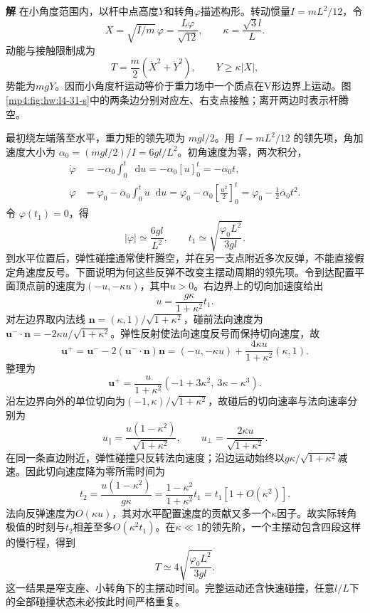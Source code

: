 \documentclass[11pt,openany,fontset=fandol]{ctexbook}
\theoremstyle{definition}\newtheorem{example}{例}[chapter]\newtheorem{exercise}{习题}[chapter]
\newcommand{\SolutionStart}{\par\medskip\ifdim\pagetotal>0pt\ifdim\dimexpr\pagegoal-\pagetotal\relax<3\baselineskip\newpage\fi\fi\noindent\textbf{解}\quad\ignorespaces}
\newenvironment{solution}{\SolutionStart}{\par\medskip}
\newcommand{\dd}{\mathop{}\!\mathrm d}\newcommand{\ee}{\mathrm e}\newcommand{\vct}[1]{\bm{#1}}
\begin{document}
\begin{solution}
在小角度范围内，以杆中点高度$Y$和转角$\varphi$描述构形。转动惯量$I=mL^2/12$，令
\[
 X=\sqrt{I/m}\,\varphi=\frac{L\varphi}{\sqrt{12}},
 \qquad\kappa=\frac{\sqrt3l}{L}.
\]
动能与接触限制成为
\[
 T=\frac m2(\dot X^2+\dot Y^2),\qquad
 Y\ge\kappa|X|,
\]
势能为$mgY$。因而小角度杆运动等价于重力场中一个质点在V形边界上运动。图\ref{mp4:fig:hw:l4-31-s}中的两条边分别对应左、右支点接触；离开两边时表示杆腾空。

最初绕左端落至水平，重力矩的领先项为 $mgl/2$。用 $I=mL^2/12$ 的领先项，角加速度大小为 $\alpha_0=(mgl/2)/I=6gl/L^2$。初角速度为零，两次积分，
\[
\begin{aligned}
\dot\varphi&=-\alpha_0\int_0^t\dd u=-\alpha_0[u]_0^t=-\alpha_0t,\\
\varphi&=\varphi_0-\alpha_0\int_0^t u\dd u
=\varphi_0-\alpha_0\left[\frac{u^2}{2}\right]_0^t
=\varphi_0-\frac12\alpha_0t^2.
\end{aligned}
\]
令 $\varphi(t_1)=0$，得
\[
 |\ddot\varphi|\simeq\frac{6gl}{L^2},\qquad
 t_1\simeq\sqrt{\frac{\varphi_0L^2}{3gl}}.
\]
到水平位置后，弹性碰撞通常使杆腾空，并在另一支点附近多次反弹，不能直接假定角速度反号。下面说明为何这些反弹不改变主摆动周期的领先项。令到达配置平面顶点前的速度为$(-u,-\kappa u)$，其中$u>0$。右边界上的切向加速度给出
\[
u=\frac{g\kappa}{1+\kappa^2}t_1.
\]
对左边界取内法线 $\vct n=(\kappa,1)/\sqrt{1+\kappa^2}$，碰前法向速度为 $\vct u^-\cdot\vct n=-2\kappa u/\sqrt{1+\kappa^2}$。弹性反射使法向速度反号而保持切向速度，故
\[
\vct u^+=\vct u^--2(\vct u^-\cdot\vct n)\vct n
=(-u,-\kappa u)+\frac{4\kappa u}{1+\kappa^2}(\kappa,1).
\]
整理为
\[
\vct u^+=\frac{u}{1+\kappa^2}
(-1+3\kappa^2,\ 3\kappa-\kappa^3).
\]
沿左边界向外的单位切向为$(-1,\kappa)/\sqrt{1+\kappa^2}$，故碰后的切向速率与法向速率分别为
\[
u_\parallel=\frac{u(1-\kappa^2)}{\sqrt{1+\kappa^2}},\qquad
u_\perp=\frac{2\kappa u}{\sqrt{1+\kappa^2}}.
\]
在同一条直边附近，弹性碰撞只反转法向速度；沿边运动始终以$g\kappa/\sqrt{1+\kappa^2}$减速。因此切向速度降为零所需时间为
\[
t_2=\frac{u(1-\kappa^2)}{g\kappa}
=\frac{1-\kappa^2}{1+\kappa^2}t_1
=t_1[1+O(\kappa^2)].
\]
法向反弹速度为$O(\kappa u)$，其对水平配置速度的贡献又多一个$\kappa$因子。故实际转角极值的时刻与$t_2$相差至多$O(\kappa^2t_1)$。在$\kappa\ll1$的领先阶，一个主摆动包含四段这样的慢行程，得到
\[
 \boxed{T\simeq4\sqrt{\frac{\varphi_0L^2}{3gl}}}.
\]
这一结果是窄支座、小转角下的主摆动时间。完整运动还含快速碰撞，任意$l/L$下的全部碰撞状态未必按此时间严格重复。


\end{solution}
\end{document}

